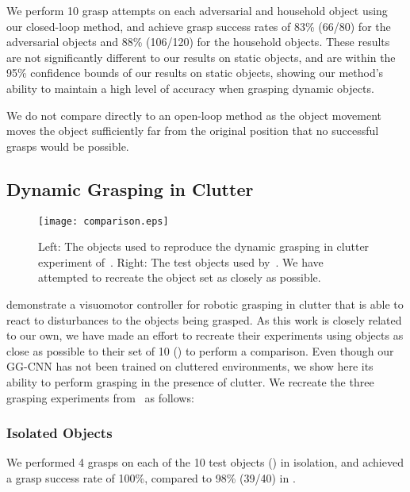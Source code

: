 \documentclass[conference]{IEEEtran}
\begin{document}
We perform 10 grasp attempts on each adversarial and household object using our closed-loop method, and achieve grasp success rates of 83\% (66/80) for the adversarial objects and 88\% (106/120) for the household objects.  These results are not significantly different to our results on static objects, and are within the 95\% confidence bounds of our results on static objects, showing our method's ability to maintain a high level of accuracy when grasping dynamic objects.  

We do not compare directly to an open-loop method as the object movement moves the object sufficiently far from the original position that no successful grasps would be possible. 


\subsection{Dynamic Grasping in Clutter}
\label{sec:clutter}

\begin{figure}[tpb]
    \centering
    \texttt{[image: comparison.eps]}
    \vspace{-6mm}
    \caption{Left: The objects used to reproduce the dynamic grasping in clutter experiment of~\cite{Viereck2017LearningImages}.  Right: The test objects used by~\cite{Viereck2017LearningImages}. We have attempted to recreate the object set as closely as possible.}
    \label{fig:comparison} 
    \vspace{-6mm}
\end{figure}

\citet{Viereck2017LearningImages} demonstrate a visuomotor controller for robotic grasping in clutter that is able to react to disturbances to the objects being grasped.  As this work is closely related to our own, we have made an effort to recreate their experiments using objects as close as possible to their set of 10 () to perform a comparison.  Even though our GG-CNN has not been trained on cluttered environments, we show here its ability to perform grasping in the presence of clutter.  We recreate the three grasping experiments from~\cite{Viereck2017LearningImages} as follows:

\subsubsection{Isolated Objects}

We performed 4 grasps on each of the 10 test objects () in isolation, and achieved a grasp success rate of 100\%, compared to 98\% (39/40) in \cite{Viereck2017LearningImages}.
\end{document}

